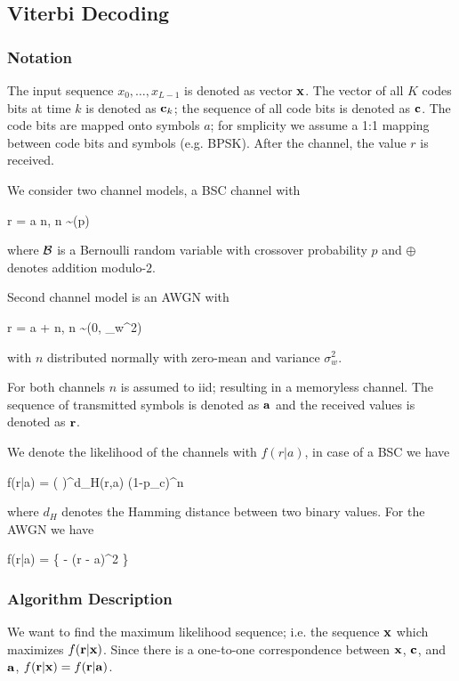 
\subsection{Viterbi Decoding}

\subsubsection{Notation}

The input sequence $x_0, \ldots, x_{L-1}$ is denoted as vector $\mathbf{x}$. The vector of all $K$ codes bits at time $k$ is denoted as $\mathbf{c}_k$; the sequence of all code bits is denoted as $\mathbf{c}$. The code bits are mapped onto symbols $a$; for smplicity we assume a 1:1 mapping between code bits and symbols (e.g. BPSK). After the channel, the value $r$ is received.

We consider two channel models, a BSC channel with 

\bee
r = a \oplus n, \quad n \sim \Bc(p)
\eee

where $\mathcal{B}$ is a Bernoulli random variable with crossover probability $p$ and $\oplus$ denotes addition modulo-$2$.

Second channel model is an AWGN with

\bee
r = a + n, \quad n \sim \Nc(0, \sigma_w^2)
\eee

with $n$ distributed normally with zero-mean and variance $\sigma_{w}^2$.

For both channels $n$ is assumed to iid; resulting in a memoryless channel. The sequence of transmitted symbols is denoted as $\mathbf{a}$ and the received values is denoted as $\mathbf{r}$.

We denote the likelihood of the channels with $f(r|a)$, in case of a BSC we have

\bee
f(r|a) = \left( \right)^{d_H(r,a)} (1-p_c)^n
\eee

where $d_H$ denotes the Hamming distance between two binary values. For the AWGN we have


\bee
f(r|a) =  \exp \left\{ -  (r - a)^2 \right\}
\eee

\subsubsection{Algorithm Description}

We want to find the maximum likelihood sequence; i.e. the sequence $\mathbf{x}$ which maximizes $f(\mathbf{r}|\mathbf{x})$. Since there is a one-to-one correspondence between $\mathbf{x}$, $\mathbf{c}$, and $\mathbf{a}$, $f(\mathbf{r}|\mathbf{x}) = f(\mathbf{r}|\mathbf{a})$.

